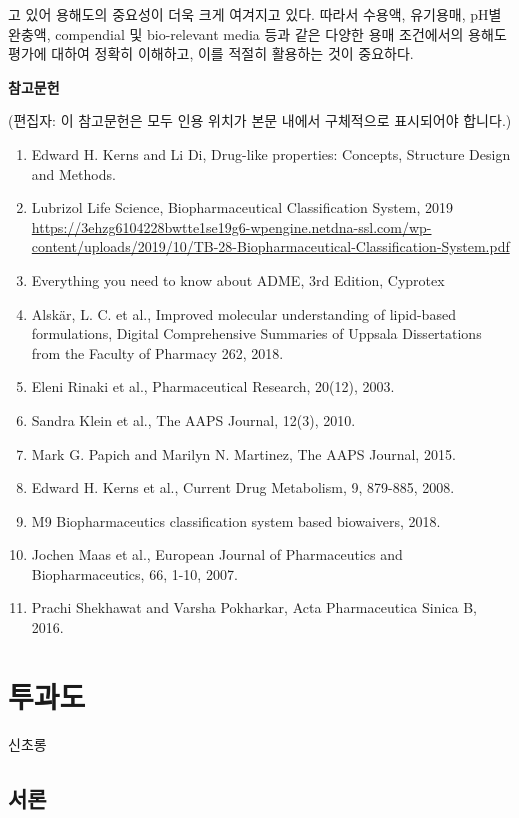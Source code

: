 \documentclass[
  11pt,
  krantz2, a4paper, twoside]{krantz}
\providecommand{\tightlist}{%
  \setlength{\itemsep}{0pt}\setlength{\parskip}{0pt}}
\begin{document}
고 있어 용해도의 중요성이 더욱 크게 여겨지고 있다.
따라서 수용액, 유기용매, pH별 완충액, compendial 및 bio-relevant media 등과 같은 다양한 용매 조건에서의 용해도 평가에 대하여 정확히 이해하고, 이를 적절히 활용하는 것이 중요하다.

\textbf{참고문헌}

(편집자: 이 참고문헌은 모두 인용 위치가 본문 내에서 구체적으로 표시되어야 합니다.)

\begin{enumerate}
\def\labelenumi{\arabic{enumi}.}
\tightlist
\item
  Edward H. Kerns and Li Di, Drug-like properties: Concepts, Structure Design and Methods.
\item
  Lubrizol Life Science, Biopharmaceutical Classification System, 2019 \url{https://3ehzg6104228bwtte1se19g6-wpengine.netdna-ssl.com/wp-content/uploads/2019/10/TB-28-Biopharmaceutical-Classification-System.pdf}
\item
  Everything you need to know about ADME, 3rd Edition, Cyprotex
\item
  Alskär, L. C. et al., Improved molecular understanding of lipid-based formulations, Digital Comprehensive Summaries of Uppsala Dissertations from the Faculty of Pharmacy 262, 2018.
\item
  Eleni Rinaki et al., Pharmaceutical Research, 20(12), 2003.
\item
  Sandra Klein et al., The AAPS Journal, 12(3), 2010.
\item
  Mark G. Papich and Marilyn N. Martinez, The AAPS Journal, 2015.
\item
  Edward H. Kerns et al., Current Drug Metabolism, 9, 879-885, 2008.
\item
  M9 Biopharmaceutics classification system based biowaivers, 2018.
\item
  Jochen Maas et al., European Journal of Pharmaceutics and Biopharmaceutics, 66, 1-10, 2007.
\item
  Prachi Shekhawat and Varsha Pokharkar, Acta Pharmaceutica Sinica B, 2016.
\end{enumerate}

\chapter{투과도}\label{uxd22cuxacfcuxb3c4}

\Large\hfill

신초롱 \normalsize

\section{서론}\label{uxc11cuxb860-1}
\end{document}
